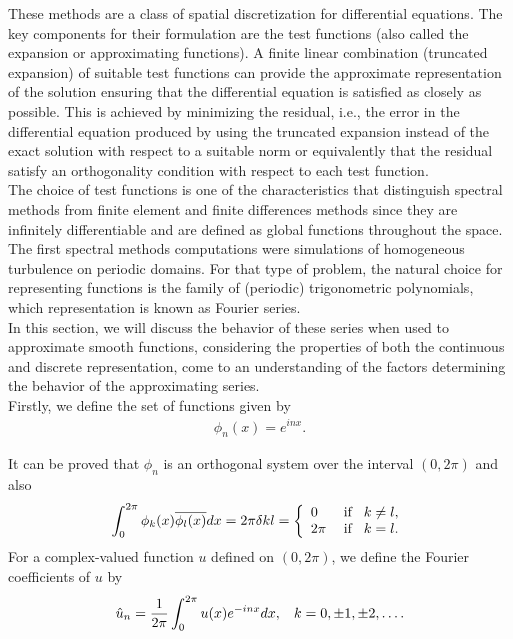     These methods are a class of spatial discretization for differential equations. The key components for their formulation are the test functions (also called the expansion or approximating functions). A finite linear combination (truncated expansion) of suitable test functions can provide the approximate representation of the solution ensuring that the differential equation is satisfied as closely as possible. This is achieved by minimizing the residual, i.e., the error in the differential equation produced by using the truncated expansion instead of the exact solution with respect to a suitable norm or equivalently that the residual satisfy an orthogonality condition with respect to each test function. \\
    
    The choice of test functions is one of the characteristics that distinguish spectral methods from finite element and finite differences methods since they are infinitely differentiable and are defined as global functions throughout the space. The first spectral methods computations were simulations of homogeneous turbulence on periodic domains. For that type of problem, the natural choice for representing functions is the family of (periodic) trigonometric polynomials, which representation is known as Fourier series. \\
    
    In this section, we will discuss the behavior of these series when used to approximate smooth functions, considering the properties of both the continuous and discrete representation, come to an understanding of the factors determining the behavior of the approximating series. \\
    
    \noindent Firstly, we define the set of functions given by
    \begin{align}
    \label{base_phi}
    	\phi_n (x) = e^{inx}.
    \end{align}
    
    \noindent It can be proved that $\phi_n$ is an orthogonal system over the interval $(0, 2 \pi)$ and also
    \begin{align}
    \label{ortho_phi}
    	\displaystyle \int_{0}^{2\pi} \phi_k (x) \overline{\phi_l (x)} dx = 2 \pi \delta{kl} = \left \lbrace \begin{array}{ll}
    	0 \hspace{3mm} &\text{if} \hspace{3mm} k \neq l, \\
    	2 \pi &\text{if} \hspace{3mm} k = l.
    	\end{array}  \right.
    \end{align}
    For a complex-valued function $u$ defined on $(0, 2 \pi)$, we define the Fourier coefficients of $u$ by
    \begin{align}
    \label{coeff_fourier}
    	\hat{u}_n = \frac{1}{2 \pi} \displaystyle \int_{0}^{2 \pi} u(x) e^{-inx} dx, \hspace{3mm}  k = 0, \pm 1, \pm 2, \dots.
    \end{align}
    
